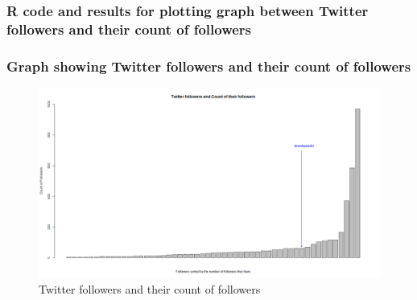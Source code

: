 \subsubsection{R code and results for plotting graph between Twitter followers and their count of followers}

\newpage
\subsubsection{Graph showing Twitter followers and their count of followers}
\begin{figure}[ht]    
    \begin{center}
        \includegraphics[scale=0.3]{followersgraph.png}
        \caption{Twitter followers and their count of followers}
        \label{graph2}
    \end{center}
\end{figure}
\newpage
